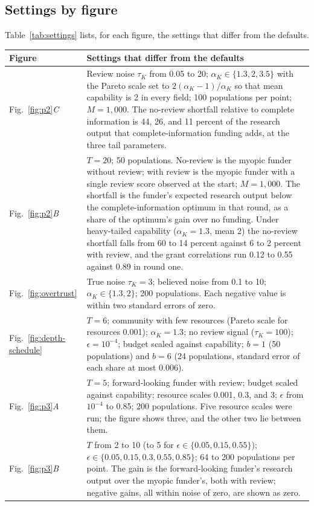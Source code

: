 \subsection*{Settings by figure}
Table~\ref{tab:settings} lists, for each figure, the settings that differ from the defaults.
\begin{table}[tp]
\centering
\small
\begin{tabular}{@{}p{2.3cm}p{10.0cm}@{}}
\toprule
Figure & Settings that differ from the defaults \\
\midrule
Fig.~\ref{fig:p2}\textit{C} & Review noise $\tau_K$ from 0.05 to 20; $\alpha_K \in \{1.3, 2, 3.5\}$ with the Pareto scale set to $2(\alpha_K - 1)/\alpha_K$ so that mean capability is 2 in every field; 100 populations per point; $M = 1{,}000$. The no-review shortfall relative to complete information is 44, 26, and 11 percent of the research output that complete-information funding adds, at the three tail parameters. \\
Fig.~\ref{fig:p2}\textit{B} & $T = 20$; 50 populations. No-review is the myopic funder without review; with review is the myopic funder with a single review score observed at the start; $M = 1{,}000$. The shortfall is the funder's expected research output below the complete-information optimum in that round, as a share of the optimum's gain over no funding. Under heavy-tailed capability ($\alpha_K = 1.3$, mean 2) the no-review shortfall falls from 60 to 14 percent against 6 to 2 percent with review, and the grant correlations run 0.12 to 0.55 against 0.89 in round one. \\
Fig.~\ref{fig:overtrust} & True noise $\tau_K = 3$; believed noise from 0.1 to 10; $\alpha_K \in \{1.3, 2\}$; 200 populations. Each negative value is within two standard errors of zero. \\
Fig.~\ref{fig:depth-schedule} & $T = 6$; community with few resources (Pareto scale for resources 0.001); $\alpha_K = 1.3$; no review signal ($\tau_K = 100$); $\epsilon = 10^{-4}$; budget scaled against capability; $b = 1$ (50 populations) and $b = 6$ (24 populations, standard error of each share at most 0.006). \\
Fig.~\ref{fig:p3}\textit{A} & $T = 5$; forward-looking funder with review; budget scaled against capability; resource scales 0.001, 0.3, and 3; $\epsilon$ from $10^{-4}$ to 0.85; 200 populations. Five resource scales were run; the figure shows three, and the other two lie between them. \\
Fig.~\ref{fig:p3}\textit{B} & $T$ from 2 to 10 (to 5 for $\epsilon \in \{0.05, 0.15, 0.55\}$); $\epsilon \in \{0.05, 0.15, 0.3, 0.55, 0.85\}$; 64 to 200 populations per point. The gain is the forward-looking funder's research output over the myopic funder's, both with review; negative gains, all within noise of zero, are shown as zero. \\

\end{tabular}
\end{table}
